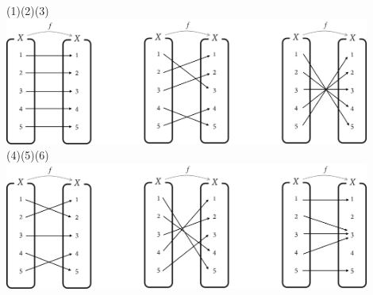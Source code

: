 \documentclass{oblivoir}
\begin{document}
%
\label{inverse17}
\begin{center}
(1)\hspace{105pt}(2)\hspace{105pt}(3)\\
\includegraphics[width=0.9\textwidth]{inverse_17-1}\\[10pt]
(4)\hspace{105pt}(5)\hspace{105pt}(6)\\
\includegraphics[width=0.9\textwidth]{inverse_17-2}
\end{center}

\newpage
\end{document}
